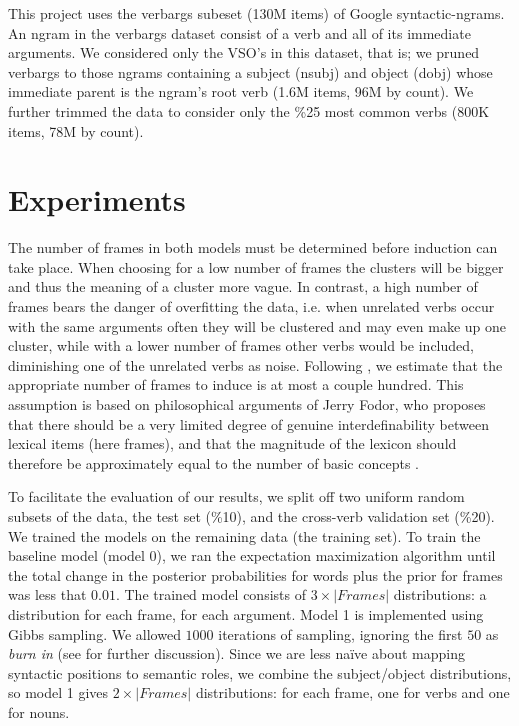 \documentclass{article} %
\begin{document}
This project uses the verbargs subeset (130M items) of Google syntactic-ngrams.
An ngram in the verbargs dataset consist of a verb and all of its 
immediate arguments.
We considered only the VSO's in this dataset, that is; we pruned verbargs to
those ngrams containing a subject (nsubj) and object (dobj) whose immediate parent
is the ngram's root verb (1.6M items, 96M by count). 
We further trimmed the data to consider only the \%25 most common verbs 
(800K items, 78M by count).



\section{Experiments}
The number of frames in both models must be determined before induction can take place. When choosing for a low number of frames the clusters will be bigger and thus the meaning of a cluster more vague. In contrast, a high number of frames bears the danger of overfitting the data, i.e. when unrelated verbs occur with the same arguments often they will be clustered and may even make up one cluster, while with a lower number of frames other verbs would be included, diminishing one of the unrelated verbs as noise. Following \citet{rooth1999}, we estimate that the appropriate number of frames to induce is at most a couple hundred. This assumption is based on philosophical arguments of Jerry Fodor, who proposes that there should be a very limited degree of genuine interdefinability between lexical items (here frames), and that the magnitude of the lexicon should therefore be approximately equal to the number of basic concepts \citep{fodor1998}.

To facilitate the evaluation of our results, we split off two uniform random subsets of the data, the test set (\%10), and the cross-verb validation set (\%20). We trained the models on the remaining data (the training set). To train the baseline model (model 0), we ran the expectation maximization algorithm until the total change in the posterior probabilities for words plus the prior for frames was less that $0.01$. The trained model consists of $3\times|Frames|$ distributions: a distribution for each frame, for each argument. Model 1 is implemented using Gibbs sampling. We allowed $1000$ iterations of sampling, ignoring the first $50$ as \emph{burn in} (see \citet{raftery1992} for further discussion). Since we are less na\"ive about mapping syntactic positions to semantic roles, we combine the subject/object distributions, so model 1 gives $2\times|Frames|$ distributions: for each frame, one for verbs and one for nouns.
\end{document}
